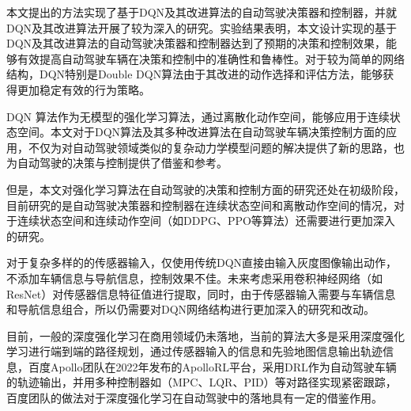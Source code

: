 %
%
%
%
%
%

\renewcommand{\thechapter}{结论}



本文提出的方法实现了基于DQN及其改进算法的自动驾驶决策器和控制器，并就DQN及其改进算法开展了较为深入的研究。实验结果表明，本文设计实现的基于DQN及其改进算法的自动驾驶决策器和控制器达到了预期的决策和控制效果，能够有效提高自动驾驶车辆在决策和控制中的准确性和鲁棒性。对于较为简单的网络结构，DQN特别是Double DQN算法由于其改进的动作选择和评估方法，能够获得更加稳定有效的行为策略。

DQN 算法作为无模型的强化学习算法，通过离散化动作空间，能够应用于连续状态空间。本文对于DQN算法及其多种改进算法在自动驾驶车辆决策控制方面的应用，不仅为对自动驾驶领域类似的复杂动力学模型问题的解决提供了新的思路，也为自动驾驶的决策与控制提供了借鉴和参考。

但是，本文对强化学习算法在自动驾驶的决策和控制方面的研究还处在初级阶段，目前研究的是自动驾驶决策器和控制器在连续状态空间和离散动作空间的情况，对于连续状态空间和连续动作空间（如DDPG、PPO等算法）还需要进行更加深入的研究。

对于复杂多样的的传感器输入，仅使用传统DQN直接由输入灰度图像输出动作，不添加车辆信息与导航信息，控制效果不佳。未来考虑采用卷积神经网络（如ResNet\cite{targ2016resnet}）对传感器信息特征值进行提取，同时，由于传感器输入需要与车辆信息和导航信息组合，所以仍需要对DQN网络结构进行更加深入的研究和改动。

目前，一般的深度强化学习在商用领域仍未落地，当前的算法大多是采用深度强化学习进行端到端的路径规划，通过传感器输入的信息和先验地图信息输出轨迹信息，百度Apollo团队在2022年发布的ApolloRL平台\cite{2022ApolloRL}，采用DRL作为自动驾驶车辆的轨迹输出，并用多种控制器如（MPC、LQR、PID）等对路径实现紧密跟踪，百度团队的做法对于深度强化学习在自动驾驶中的落地具有一定的借鉴作用。
